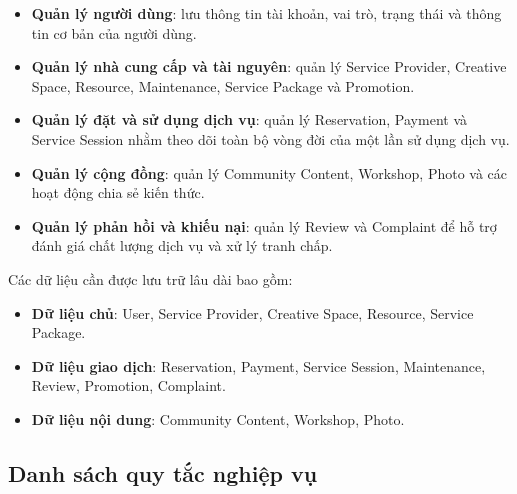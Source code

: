 \begin{itemize}
    \item \textbf{Quản lý người dùng}: lưu thông tin tài khoản, vai trò, trạng thái và thông tin cơ bản của người dùng.
    \item \textbf{Quản lý nhà cung cấp và tài nguyên}: quản lý Service Provider, Creative Space, Resource, Maintenance, Service Package và Promotion.
    \item \textbf{Quản lý đặt và sử dụng dịch vụ}: quản lý Reservation, Payment và Service Session nhằm theo dõi toàn bộ vòng đời của một lần sử dụng dịch vụ.
    \item \textbf{Quản lý cộng đồng}: quản lý Community Content, Workshop, Photo và các hoạt động chia sẻ kiến thức.
    \item \textbf{Quản lý phản hồi và khiếu nại}: quản lý Review và Complaint để hỗ trợ đánh giá chất lượng dịch vụ và xử lý tranh chấp.
\end{itemize}

Các dữ liệu cần được lưu trữ lâu dài bao gồm:
\begin{itemize}
    \item \textbf{Dữ liệu chủ}: User, Service Provider, Creative Space, Resource, Service Package.
    \item \textbf{Dữ liệu giao dịch}: Reservation, Payment, Service Session, Maintenance, Review, Promotion, Complaint.
    \item \textbf{Dữ liệu nội dung}: Community Content, Workshop, Photo.
\end{itemize}

\subsection{Danh sách quy tắc nghiệp vụ}


